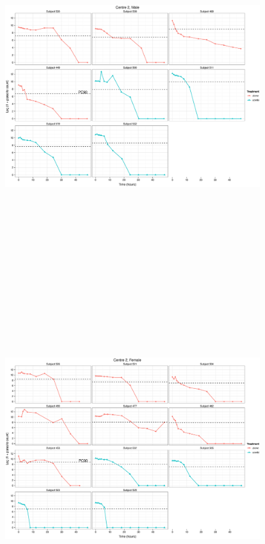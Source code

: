 \begin{figure}
\includegraphics[height=150mm]{Araw2M.eps}
\end{figure}
\begin{figure}
\includegraphics[height=150mm]{Araw2F.eps}
\end{figure}
